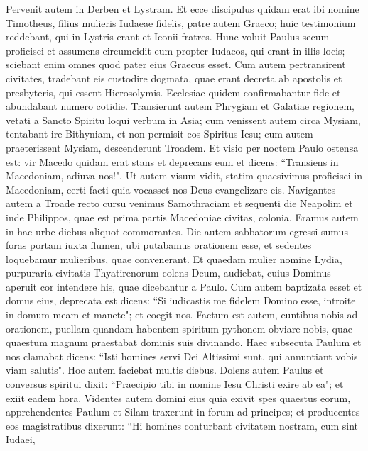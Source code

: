 \begin{biblechapter}  
\verse Pervenit autem in Derben et Lystram. Et ecce discipulus quidam erat ibi nomine Timotheus, filius mulieris Iudaeae fidelis, patre autem Graeco; 
\verse huic testimonium reddebant, qui in Lystris erant et Iconii fratres. 
\verse Hunc voluit Paulus secum proficisci et assumens circumcidit eum propter Iudaeos, qui erant in illis locis; sciebant enim omnes quod pater eius Graecus esset. 
\verse Cum autem pertransirent civitates, tradebant eis custodire dogmata, quae erant decreta ab apostolis et presbyteris, qui essent Hierosolymis. 
\verse Ecclesiae quidem confirmabantur fide et abundabant numero cotidie. 
\verse Transierunt autem Phrygiam et Galatiae regionem, vetati a Sancto Spiritu loqui verbum in Asia; 
\verse cum venissent autem circa Mysiam, tentabant ire Bithyniam, et non permisit eos Spiritus Iesu; 
\verse cum autem praeterissent Mysiam, descenderunt Troadem. 
\verse Et visio per noctem Paulo ostensa est: vir Macedo quidam erat stans et deprecans eum et dicens: “Transiens in Macedoniam, adiuva nos!". 
\verse Ut autem visum vidit, statim quaesivimus proficisci in Macedoniam, certi facti quia vocasset nos Deus evangelizare eis. 
\verse Navigantes autem a Troade recto cursu venimus Samothraciam et sequenti die Neapolim 
\verse et inde Philippos, quae est prima partis Macedoniae civitas, colonia. Eramus autem in hac urbe diebus aliquot commorantes. 
\verse Die autem sabbatorum egressi sumus foras portam iuxta flumen, ubi putabamus orationem esse, et sedentes loquebamur mulieribus, quae convenerant. 
\verse Et quaedam mulier nomine Lydia, purpuraria civitatis Thyatirenorum colens Deum, audiebat, cuius Dominus aperuit cor intendere his, quae dicebantur a Paulo. 
\verse Cum autem baptizata esset et domus eius, deprecata est dicens: “Si iudicastis me fidelem Domino esse, introite in domum meam et manete"; et coegit nos. 
\verse Factum est autem, euntibus nobis ad orationem, puellam quandam habentem spiritum pythonem obviare nobis, quae quaestum magnum praestabat dominis suis divinando. 
\verse Haec subsecuta Paulum et nos clamabat dicens: “Isti homines servi Dei Altissimi sunt, qui annuntiant vobis viam salutis". 
\verse Hoc autem faciebat multis diebus. Dolens autem Paulus et conversus spiritui dixit: “Praecipio tibi in nomine Iesu Christi exire ab ea"; et exiit eadem hora. 
\verse Videntes autem domini eius quia exivit spes quaestus eorum, apprehendentes Paulum et Silam traxerunt in forum ad principes; 
\verse et producentes eos magistratibus dixerunt: “Hi homines conturbant civitatem nostram, cum sint Iudaei, 

\end{biblechapter}
